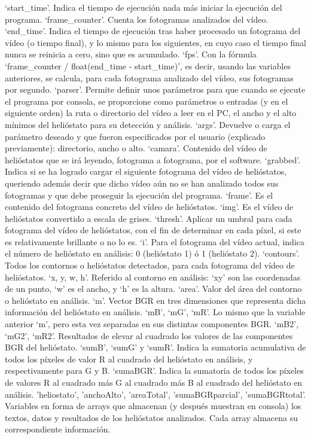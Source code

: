 \documentclass[12pt]{article}
\begin{document}
‘start\_time’. Indica el tiempo de ejecución nada más iniciar la ejecución del programa.
‘frame\_counter’. Cuenta los fotogramas analizados del vídeo.
‘end\_time’. Indica el tiempo de ejecución tras haber procesado un fotograma del vídeo (o tiempo final), y lo mismo para los siguientes, en cuyo caso el tiempo final nunca se reinicia a cero, sino que es acumulado.
‘fps’. Con la fórmula ‘frame\_counter / float(end\_time - start\_time)’, es decir, usando las variables anteriores, se calcula, para cada fotograma analizado del vídeo, sus fotogramas por segundo.
‘parser’. Permite definir unos parámetros para que cuando se ejecute el programa por consola, se proporcione como parámetros o entradas (y en el siguiente orden) la ruta o directorio del vídeo a leer en el PC, el ancho y el alto mínimos del helióstato para su detección y análisis.
‘args’. Devuelve o carga el parámetro deseado y que fueron especificados por el usuario (explicado previamente): directorio, ancho o alto.
‘camara’. Contenido del vídeo de helióstatos que se irá leyendo, fotograma a fotograma, por el software.
‘grabbed’. Indica si se ha logrado cargar el siguiente fotograma del vídeo de helióstatos, queriendo además decir que dicho vídeo aún no se han analizado todos sus fotogramas y que debe proseguir la ejecución del programa.
‘frame’. Es el contenido del fotograma concreto del vídeo de helióstatos.
‘img’. Es el vídeo de helióstatos convertido a escala de grises.
‘thresh’. Aplicar un umbral para cada fotograma del vídeo de helióstatos, con el fin de determinar en cada píxel, si este es relativamente brillante o no lo es.
‘i’. Para el fotograma del vídeo actual, indica el número de helióstato en análisis: 0 (helióstato 1) ó 1 (helióstato 2).
‘contours’. Todos los contornos o helióstatos detectados, para cada fotograma del vídeo de helióstatos.
‘x, y, w, h’. Referido al contorno en análisis: ‘xy’ son las coordenadas de un punto, ‘w’ es el ancho, y ‘h’ es la altura.
‘area’. Valor del área del contorno o helióstato en análisis.
‘m’. Vector BGR en tres dimensiones que representa dicha información del helióstato en análisis.
‘mB’, ‘mG’, ‘mR’. Lo mismo que la variable anterior ‘m’, pero esta vez separadas en sus distintas componentes BGR.
‘mB2’, ‘mG2’, ‘mR2’. Resultados de elevar al cuadrado los valores de las componentes BGR del helióstato.
‘sumB’, ‘sumG’ y ‘sumR’. Indica la sumatoria acumulativa de todos los píxeles de valor R al cuadrado del helióstato en análisis, y respectivamente para G y B.
‘sumaBGR’. Indica la sumatoria de todos los píxeles de valores R al cuadrado más G al cuadrado más B al cuadrado del helióstato en análisis.
'heliostato', 'anchoAlto', 'areaTotal', 'sumaBGRparcial', 'sumaBGRtotal'. Variables en forma de arrays que almacenan (y después muestran en consola) los textos, datos y resultados de los helióstatos analizados. Cada array almacena su correspondiente información.
\end{document}

